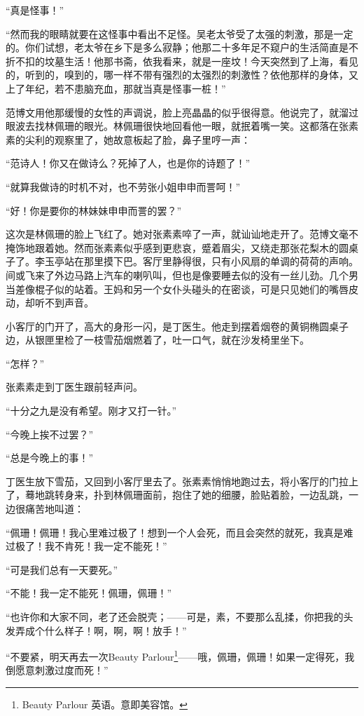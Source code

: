 \par “真是怪事！”
\par “然而我的眼睛就要在这怪事中看出不足怪。吴老太爷受了太强的刺激，那是一定的。你们试想，老太爷在乡下是多么寂静；他那二十多年足不窥户的生活简直是不折不扣的坟墓生活！他那书斋，依我看来，就是一座坟！今天突然到了上海，看见的，听到的，嗅到的，哪一样不带有强烈的太强烈的刺激性？依他那样的身体，又上了年纪，若不患脑充血，那就当真是怪事一桩！”
\par 范博文用他那缓慢的女性的声调说，脸上亮晶晶的似乎很得意。他说完了，就溜过眼波去找林佩珊的眼光。林佩珊很快地回看他一眼，就抿着嘴一笑。这都落在张素素的尖利的观察里了，她故意板起了脸，鼻子里哼一声：
\par “范诗人！你又在做诗么？死掉了人，也是你的诗题了！”
\par “就算我做诗的时机不对，也不劳张小姐申申而詈呵！”
\par “好！你是要你的林妹妹申申而詈的罢？”
\par 这次是林佩珊的脸上飞红了。她对张素素啐了一声，就讪讪地走开了。范博文毫不掩饰地跟着她。然而张素素似乎感到更悲哀，蹙着眉尖，又绕走那张花梨木的圆桌子了。李玉亭站在那里摸下巴。客厅里静得很，只有小风扇的单调的荷荷的声响。间或飞来了外边马路上汽车的喇叭叫，但也是像要睡去似的没有一丝儿劲。几个男当差像棍子似的站着。王妈和另一个女仆头碰头的在密谈，可是只见她们的嘴唇皮动，却听不到声音。
\par 小客厅的门开了，高大的身形一闪，是丁医生。他走到摆着烟卷的黄铜椭圆桌子边，从银匣里检了一枝雪茄烟燃着了，吐一口气，就在沙发椅里坐下。
\par “怎样？”
\par 张素素走到丁医生跟前轻声问。
\par “十分之九是没有希望。刚才又打一针。”
\par “今晚上挨不过罢？”
\par “总是今晚上的事！”
\par 丁医生放下雪茄，又回到小客厅里去了。张素素悄悄地跑过去，将小客厅的门拉上了，蓦地跳转身来，扑到林佩珊面前，抱住了她的细腰，脸贴着脸，一边乱跳，一边很痛苦地叫道：
\par “佩珊！佩珊！我心里难过极了！想到一个人会死，而且会突然的就死，我真是难过极了！我不肯死！我一定不能死！”
\par “可是我们总有一天要死。”
\par “不能！我一定不能死！佩珊，佩珊！”
\par “也许你和大家不同，老了还会脱壳；——可是，素，不要那么乱揉，你把我的头发弄成个什么样子！啊，啊，啊！放手！”
\par “不要紧，明天再去一次Beauty Parlour\footnote{Beauty Parlour 英语。意即美容馆。}——哦，佩珊，佩珊！如果一定得死，我倒愿意刺激过度而死！”
